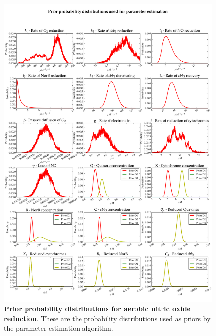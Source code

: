 \begin{figure}[tbp]
 \centering
 \includegraphics[width=15cm, trim=0cm 0cm 0cm 0cm]{./06-noreduction/data/aer-no-priors.pdf}
 \caption[Prior probability distributions for aerobic nitric oxide reduction]{{\bf Prior probability distributions for aerobic nitric oxide reduction}. These are the probability distributions used as priors by the parameter estimation algorithm.
 \label{fig:aer_no_priors}}
\end{figure}
\afterpage{\clearpage}

